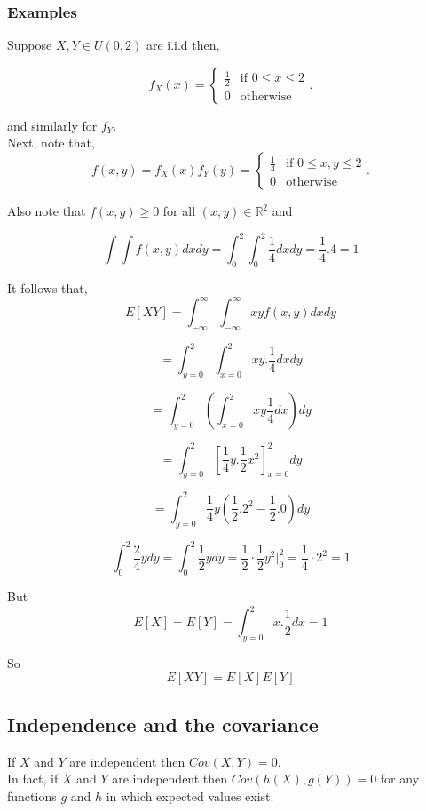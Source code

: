\documentclass[12pt,a4paper]{article}
\theoremstyle{regla}
\theoremstyle{remark}
\theoremstyle{definition}
\theoremstyle{nonumberbreak}
\begin{document}
\subsubsection{Examples}
\begin{xmpl}
Suppose $X,Y \in U (0,2)$ are  i.i.d then,

$$
f_X (x) = 
\begin{cases}
  \frac{1}{2} & \text{if } 0 \leq x \leq 2 \\
  0 &\text{otherwise}
\end{cases}.
$$

and similarly for $f_Y$.\\

Next, note that,
$$
f(x,y) =  f_X (x) f_Y (y) = 
\begin{cases}
  \frac{1}{4} &\text{if } 0 \leq x,y \leq 2\\
  0 &\text{otherwise}
\end{cases}.
$$

Also note that $f(x,y) \geq 0$ for all $ (x,y) \in \mathbb{R}^2 $ and 

$$\int\int  f(x,y)dxdy = \int_{0}^{2}\int_{0}^{2} \frac {1}{4} dxdy =  \frac {1}{4}.4 = 1$$

It follows that,
$$ E [X Y] = \int_{-\infty}^{\infty}\int_{-\infty}^{\infty} xy f(x,y) dxdy$$

$$ = \int_{y=0}^{2}\int_{x=0}^{2} xy. \frac {1}{4}dxdy $$

$$ = \int_{y=0}^{2} (\int_{x=0}^{2} xy \frac {1}{4} dx) dy$$

$$= \int_{y=0}^{2} [\frac {1}{4}y. \frac {1}{2}x^2]_{x=0}^ {2} dy $$

 

$$ = \int_{y=0}^{2} \frac {1}{4}y (\frac {1}{2}.2^2 - \frac {1}{2}.0) dy$$

$$ \int_{0}^{2} \frac {2}{4}y dy = \int_{0}^{2} \frac {1}{2}y dy = \frac {1}{2}\cdot \frac {1}{2} y^2 | _{0}^2 = \frac {1}{4}\cdot 2^2 = 1 $$

But $$ E [X] = E[Y] = \int_{y=0}^{2} x. \frac {1}{2} dx = 1$$

So $$E[XY] = E [X] E[Y] $$

\end{xmpl}




\subsection{Independence and the covariance}
\begin{fbox}
\begin{minipage}{0.97\textwidth}
If $X$ and $Y$ are independent then $Cov(X,Y)=0$.\\

In fact, if $X$ and $Y$ are independent then $Cov(h(X),g(Y))=0$ for any functions $g$ and $h$ in which expected values exist.

\end{minipage}
\end{fbox}
\end{document}
